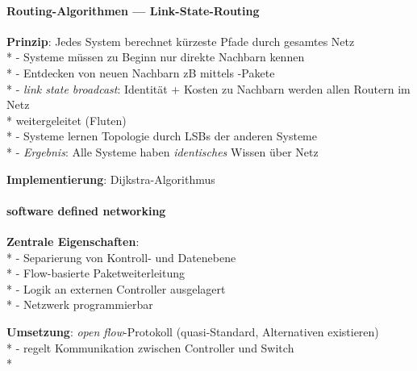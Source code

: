 \paragraph{Routing-Algorithmen --- Link-State-Routing}
\begin{items}
  \item \textbf{Prinzip}: Jedes System berechnet kürzeste Pfade durch gesamtes Netz\\*
    - Systeme müssen zu Beginn nur direkte Nachbarn kennen \\*
    - Entdecken von neuen Nachbarn zB mittels -Pakete \\*
    - \emph{link state broadcast}: Identität + Kosten zu Nachbarn werden allen Routern im Netz \\* \phantom{-} \phantom{\( \cdot \)} weitergeleitet (Fluten) \\*
    - Systeme lernen Topologie durch LSBs der anderen Systeme \\*
    - \emph{Ergebnis}: Alle Systeme haben \emph{identisches} Wissen über Netz
  \item \textbf{Implementierung}: Dijkstra-Algorithmus
\end{items}

\paragraph{software defined networking}
\begin{items}
  \item \textbf{Zentrale Eigenschaften}: \\*
    - Separierung von Kontroll- und Datenebene \\*
    - Flow-basierte Paketweiterleitung \\*
    - Logik an externen Controller ausgelagert \\*
    - Netzwerk programmierbar
  \item \textbf{Umsetzung}: \emph{open flow}-Protokoll (quasi-Standard, Alternativen existieren) \\*
    - regelt Kommunikation zwischen Controller und Switch \\*
\end{items}

